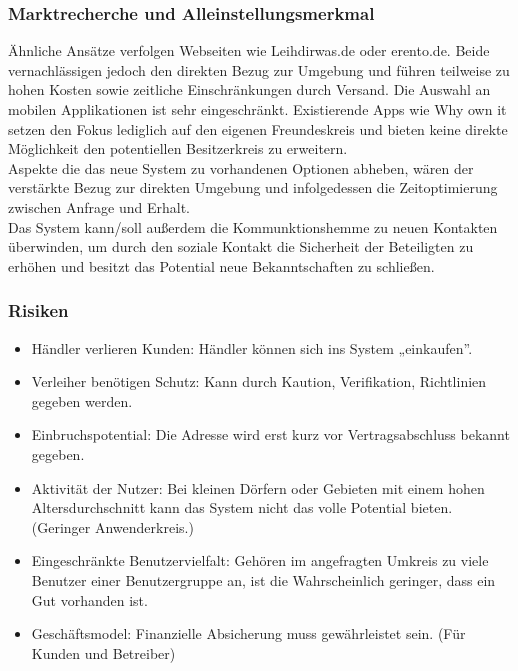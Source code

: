 \subsubsection{Marktrecherche und Alleinstellungsmerkmal}
Ähnliche Ansätze verfolgen Webseiten wie Leihdirwas.de oder erento.de. Beide vernachlässigen jedoch den direkten Bezug zur Umgebung und führen teilweise zu hohen Kosten sowie zeitliche Einschränkungen  durch Versand. Die Auswahl an mobilen Applikationen ist sehr eingeschränkt. Existierende Apps wie Why own it setzen den Fokus lediglich auf den eigenen Freundeskreis und bieten keine direkte Möglichkeit den potentiellen Besitzerkreis zu erweitern.\\
Aspekte die das neue System zu vorhandenen Optionen abheben, wären der verstärkte Bezug zur direkten Umgebung und infolgedessen die Zeitoptimierung zwischen Anfrage und Erhalt.\\
Das System kann/soll außerdem die Kommunktionshemme zu neuen Kontakten überwinden, um durch den soziale Kontakt die Sicherheit der Beteiligten zu erhöhen und besitzt das Potential neue Bekanntschaften zu schließen.


\subsubsection{Risiken}
\begin{itemize}
   \item Händler verlieren Kunden: Händler können sich ins System „einkaufen”.
   \item Verleiher benötigen Schutz: Kann durch Kaution, Verifikation, Richtlinien gegeben werden.
   \item Einbruchspotential: Die Adresse wird erst kurz vor Vertragsabschluss bekannt gegeben.
   \item Aktivität der Nutzer: Bei kleinen Dörfern oder Gebieten mit einem hohen Altersdurchschnitt kann das System nicht das volle Potential bieten. (Geringer Anwenderkreis.)
   \item Eingeschränkte Benutzervielfalt: Gehören im angefragten Umkreis zu viele Benutzer einer Benutzergruppe an, ist die Wahrscheinlich geringer, dass ein Gut vorhanden ist.
   \item Geschäftsmodel: Finanzielle Absicherung muss gewährleistet sein. (Für Kunden und Betreiber)
\end{itemize}

